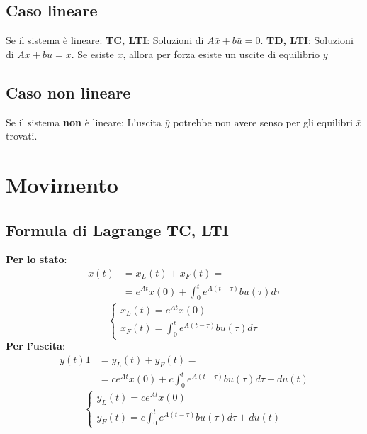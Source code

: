 \begin{landscape}
\begin{multicols*}{3}
    \subsection{Caso lineare}
    Se il sistema è lineare:\newline
    \textbf{TC, LTI}: Soluzioni di $A\bar{x} + b \bar{u} = 0$.\newline
    \textbf{TD, LTI}: Soluzioni di $A\bar{x} + b \bar{u} = \bar{x}$.\newline
    Se esiste $\bar{x}$, allora per forza esiste un uscite di equilibrio $\bar{y}$
    \subsection{Caso non lineare}
    Se il sistema \textbf{non} è lineare:\newline
    L'uscita $\bar{y}$ potrebbe non avere senso per gli equilibri $\bar{x}$ trovati. 
    \newpage\section{Movimento}
    \subsection{Formula di Lagrange TC, LTI}
    \textbf{Per lo stato}:
    \[
            \begin{split}
            x(t) &= x_L(t) + x_F(t) =\\
            &=e^{At} x(0) + \int_{0}^{t}e^{A(t-\tau)}bu(\tau)d \tau
            \end{split}
    \]
    \[
        \begin{cases}
            x_L(t) = e^{At} x(0)\\
            x_F(t) = \int_{0}^{t}e^{A(t-\tau)}bu(\tau)d \tau
        \end{cases}
    \]
    \textbf{Per l'uscita}:
    \[
            \begin{split}
            y(t) 1 &= y_L(t) + y_F(t) =\\
            &= ce^{At}x(0) + c \int_{0}^{t}e^{A(t-\tau)}bu(\tau)d \tau + du(t)
            \end{split}
    \]
    \[
        \begin{cases}
            y_L(t) = ce^{At}x(0)\\
            y_F(t) = c \int_{0}^{t}e^{A(t-\tau)}bu(\tau)d \tau + du(t)
        \end{cases}
    \]

\end{multicols*}
\end{landscape}
